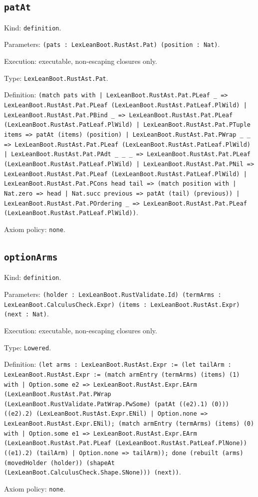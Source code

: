 \documentclass[11pt]{article}
\begin{document}
\subsection*{\texttt{patAt}}
\noindent Kind: \texttt{definition}.\par
\noindent Parameters: \texttt{(pats : LexLeanBoot.RustAst.Pat) (position : Nat)}.\par
\noindent Execution: executable, non-escaping closures only.\par
\noindent Type: \texttt{LexLeanBoot.RustAst.Pat}.\par
\noindent Definition: \texttt{(match pats with | LexLeanBoot.RustAst.Pat.PLeaf \_ => LexLeanBoot.RustAst.Pat.PLeaf (LexLeanBoot.RustAst.PatLeaf.PlWild) | LexLeanBoot.RustAst.Pat.PBind \_ => LexLeanBoot.RustAst.Pat.PLeaf (LexLeanBoot.RustAst.PatLeaf.PlWild) | LexLeanBoot.RustAst.Pat.PTuple items => patAt (items) (position) | LexLeanBoot.RustAst.Pat.PWrap \_ \_ => LexLeanBoot.RustAst.Pat.PLeaf (LexLeanBoot.RustAst.PatLeaf.PlWild) | LexLeanBoot.RustAst.Pat.PAdt \_ \_ \_ => LexLeanBoot.RustAst.Pat.PLeaf (LexLeanBoot.RustAst.PatLeaf.PlWild) | LexLeanBoot.RustAst.Pat.PNil => LexLeanBoot.RustAst.Pat.PLeaf (LexLeanBoot.RustAst.PatLeaf.PlWild) | LexLeanBoot.RustAst.Pat.PCons head tail => (match position with | Nat.zero => head | Nat.succ previous => patAt (tail) (previous)) | LexLeanBoot.RustAst.Pat.POrdering \_ => LexLeanBoot.RustAst.Pat.PLeaf (LexLeanBoot.RustAst.PatLeaf.PlWild))}.\par
\noindent Axiom policy: \texttt{none}.\par
\subsection*{\texttt{optionArms}}
\noindent Kind: \texttt{definition}.\par
\noindent Parameters: \texttt{(holder : LexLeanBoot.RustValidate.Id) (termArms : LexLeanBoot.CalculusCheck.Expr) (items : LexLeanBoot.RustAst.Expr) (next : Nat)}.\par
\noindent Execution: executable, non-escaping closures only.\par
\noindent Type: \texttt{Lowered}.\par
\noindent Definition: \texttt{(let arms : LexLeanBoot.RustAst.Expr := (let tailArm : LexLeanBoot.RustAst.Expr := (match armEntry (termArms) (items) (1) with | Option.some e2 => LexLeanBoot.RustAst.Expr.EArm (LexLeanBoot.RustAst.Pat.PWrap (LexLeanBoot.RustValidate.PatWrap.PwSome) (patAt ((e2).1) (0))) ((e2).2) (LexLeanBoot.RustAst.Expr.ENil) | Option.none => LexLeanBoot.RustAst.Expr.ENil); (match armEntry (termArms) (items) (0) with | Option.some e1 => LexLeanBoot.RustAst.Expr.EArm (LexLeanBoot.RustAst.Pat.PLeaf (LexLeanBoot.RustAst.PatLeaf.PlNone)) ((e1).2) (tailArm) | Option.none => tailArm)); done (rebuilt (arms) (movedHolder (holder)) (shapeAt (LexLeanBoot.CalculusCheck.Shape.SNone))) (next))}.\par
\noindent Axiom policy: \texttt{none}.\par
\end{document}
